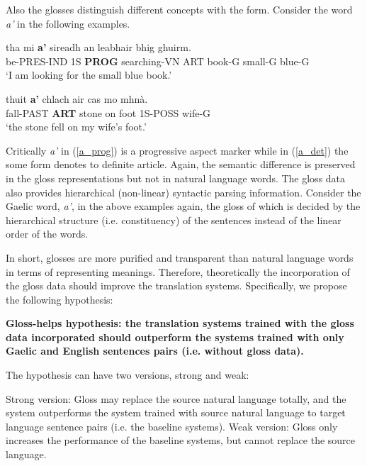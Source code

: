 \documentclass[a4paper]{article}
\begin{document}
Also the glosses distinguish different concepts with the form. Consider the word \textit{a'} in the following examples.  

\begin{exe}  
\ex \label{a_prog}
\gll tha mi \textbf{a'} sireadh an leabhair bhig ghuirm.\\
be-PRES-IND 1S \textbf{PROG} searching-VN ART book-G small-G blue-G\\
\glt `I am looking for the small blue book.' \citep[p. 29]{lamb2001scottish}

\ex \label{a_det}
\gll thuit \textbf{a'} chlach air cas mo mhn\`a.\\
fall-PAST \textbf{ART} stone on foot 1S-POSS wife-G\\
\glt`the stone fell on my wife's foot.' \citep[p. 30]{lamb2001scottish} 	
\end{exe}

Critically \textit{a'} in (\ref{a_prog}) is a progressive aspect marker while in (\ref{a_det}) the some form denotes to definite article. Again, the semantic difference is preserved in the gloss representations but not in natural language words.  
The gloss data also provides hierarchical (non-linear) syntactic parsing information. Consider the Gaelic word, \textit{a'}, in the above examples again, the gloss of which is decided by the hierarchical structure (i.e. constituency) of the sentences instead of the linear order of the words.    

In short, glosses are more purified and transparent than natural language words in terms of representing meanings. Therefore, theoretically the incorporation of the gloss data should improve the translation systems. Specifically, we propose the following hypothesis:

\begin{exe} 
\ex \textbf{Gloss-helps hypothesis: the translation systems trained with the gloss data incorporated should outperform the systems trained with only Gaelic and English sentences pairs (i.e. without gloss data).}\label{hypothesis}

The hypothesis can have two versions, strong and weak:
	\begin{xlist}
	\ex \label{strong_hy} Strong version: Gloss may replace the source natural language totally, and the system outperforms the system trained with source natural language to target language sentence pairs (i.e. the baseline systems).  
	\ex \label{weak_hy} Weak version: Gloss only increases the performance of the baseline systems, but cannot replace the source language.
	\end{xlist}
\end{exe}
\end{document}
